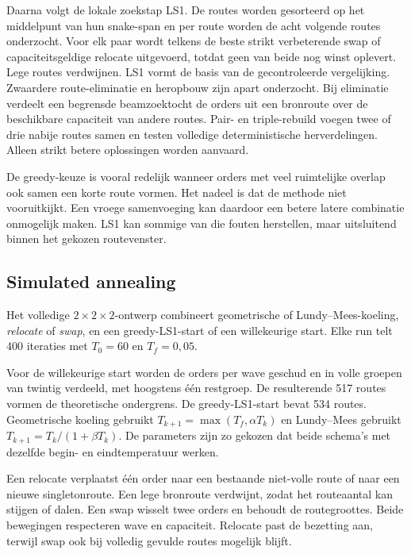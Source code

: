 \documentclass[a4paper,11pt]{article}
\begin{document}
Daarna volgt de lokale zoekstap LS1. De routes worden gesorteerd op het
middelpunt van hun snake-span en per route worden de acht volgende routes
onderzocht. Voor elk paar wordt telkens de beste strikt verbeterende swap of
capaciteitsgeldige relocate uitgevoerd, totdat geen van beide nog winst oplevert.
Lege routes verdwijnen. LS1 vormt de basis van de gecontroleerde vergelijking.
Zwaardere route-eliminatie en heropbouw zijn apart onderzocht. Bij eliminatie
verdeelt een begrensde beamzoektocht de orders uit een bronroute over de
beschikbare capaciteit van andere routes.
Pair- en triple-rebuild voegen twee of drie nabije routes samen en testen
volledige deterministische herverdelingen. Alleen strikt betere oplossingen
worden aanvaard.

De greedy-keuze is vooral redelijk wanneer orders met veel ruimtelijke overlap
ook samen een korte route vormen. Het nadeel is dat de methode niet vooruitkijkt.
Een vroege samenvoeging kan daardoor een betere latere combinatie onmogelijk
maken. LS1 kan sommige van die fouten herstellen, maar uitsluitend binnen het
gekozen routevenster.

\subsection{Simulated annealing}
Het volledige $2\times2\times2$-ontwerp combineert geometrische of
Lundy--Mees-koeling, \emph{relocate} of \emph{swap}, en een greedy-LS1-start of
een willekeurige start. Elke run telt 400 iteraties met $T_0=60$ en $T_f=0,05$.

Voor de willekeurige start worden de orders per wave geschud en in volle groepen
van twintig verdeeld, met hoogstens één restgroep. De resulterende 517 routes
vormen de theoretische ondergrens. De greedy-LS1-start bevat 534 routes.
Geometrische koeling gebruikt
$T_{k+1}=\max(T_f,\alpha T_k)$ en Lundy--Mees gebruikt
$T_{k+1}=T_k/(1+\beta T_k)$. De parameters zijn zo gekozen dat beide schema's
met dezelfde begin- en eindtemperatuur werken.

Een relocate verplaatst één order naar een bestaande niet-volle route of naar
een nieuwe singletonroute.
Een lege bronroute verdwijnt, zodat het routeaantal kan stijgen of dalen. Een
swap wisselt twee orders en behoudt de routegroottes. Beide bewegingen
respecteren wave en capaciteit. Relocate past de bezetting aan, terwijl swap ook
bij volledig gevulde routes mogelijk blijft.
\end{document}
